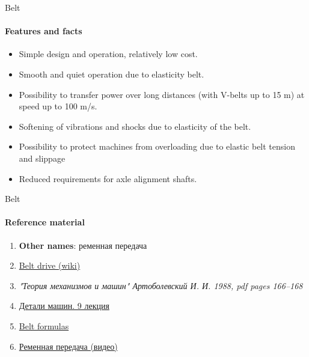 \documentclass[aspectratio=169]{beamer}
\begin{document}
\begin{frame}[t]{Belt}
    \framesubtitle{Features and facts}
    \begin{itemize}
        \item Simple design and operation, relatively low cost. 
        \item Smooth and quiet operation due to elasticity belt. 
        \item Possibility to transfer power over long distances (with V-belts up to 15 m) at speed up to 100 m/s. 
        \item Softening of vibrations and shocks due to elasticity of the belt. 
        \item Possibility to protect machines from overloading due to elastic belt tension and slippage  
        \item Reduced requirements for axle alignment 
        shafts.
    \end{itemize}
\end{frame}

\begin{frame}[t]{Belt}
    \framesubtitle{Reference material}
    \begin{enumerate}
        \item \textbf{Other names}: ременная передача
        \item \href{https://en.m.wikipedia.org/wiki/Belt_(mechanical)}{Belt drive (wiki)}
        \item \textit{"Теория механизмов и машин" Артоболевский И. И. 1988, pdf pages 166--168 }
        \item \href{https://studfile.net/preview/2156455/}{Детали машин. 9 лекция}
        \item \href{https://youtu.be/CP_b7bzM9nQ}{Belt formulas}
        \item \href{https://youtu.be/Lr5E-WrTajs}{Ременная передача (видео)}
    \end{enumerate}
\end{frame}
\end{document}
